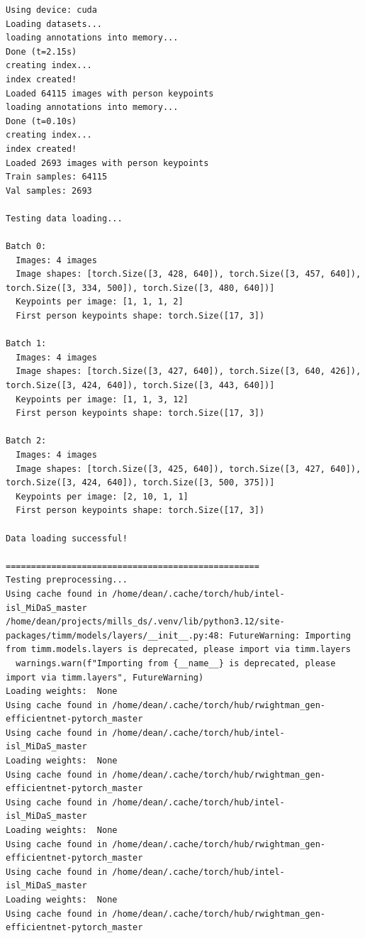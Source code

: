 \begin{lstlisting}[style=bashstyle,title={Preprocessing May Main test output},label={code:preprocessing_may_main_test_ouput}]
Using device: cuda
Loading datasets...
loading annotations into memory...
Done (t=2.15s)
creating index...
index created!
Loaded 64115 images with person keypoints
loading annotations into memory...
Done (t=0.10s)
creating index...
index created!
Loaded 2693 images with person keypoints
Train samples: 64115
Val samples: 2693

Testing data loading...

Batch 0:
  Images: 4 images
  Image shapes: [torch.Size([3, 428, 640]), torch.Size([3, 457, 640]), torch.Size([3, 334, 500]), torch.Size([3, 480, 640])]
  Keypoints per image: [1, 1, 1, 2]
  First person keypoints shape: torch.Size([17, 3])

Batch 1:
  Images: 4 images
  Image shapes: [torch.Size([3, 427, 640]), torch.Size([3, 640, 426]), torch.Size([3, 424, 640]), torch.Size([3, 443, 640])]
  Keypoints per image: [1, 1, 3, 12]
  First person keypoints shape: torch.Size([17, 3])

Batch 2:
  Images: 4 images
  Image shapes: [torch.Size([3, 425, 640]), torch.Size([3, 427, 640]), torch.Size([3, 424, 640]), torch.Size([3, 500, 375])]
  Keypoints per image: [2, 10, 1, 1]
  First person keypoints shape: torch.Size([17, 3])

Data loading successful!

==================================================
Testing preprocessing...
Using cache found in /home/dean/.cache/torch/hub/intel-isl_MiDaS_master
/home/dean/projects/mills_ds/.venv/lib/python3.12/site-packages/timm/models/layers/__init__.py:48: FutureWarning: Importing from timm.models.layers is deprecated, please import via timm.layers
  warnings.warn(f"Importing from {__name__} is deprecated, please import via timm.layers", FutureWarning)
Loading weights:  None
Using cache found in /home/dean/.cache/torch/hub/rwightman_gen-efficientnet-pytorch_master
Using cache found in /home/dean/.cache/torch/hub/intel-isl_MiDaS_master
Loading weights:  None
Using cache found in /home/dean/.cache/torch/hub/rwightman_gen-efficientnet-pytorch_master
Using cache found in /home/dean/.cache/torch/hub/intel-isl_MiDaS_master
Loading weights:  None
Using cache found in /home/dean/.cache/torch/hub/rwightman_gen-efficientnet-pytorch_master
Using cache found in /home/dean/.cache/torch/hub/intel-isl_MiDaS_master
Loading weights:  None
Using cache found in /home/dean/.cache/torch/hub/rwightman_gen-efficientnet-pytorch_master


\end{lstlisting}
